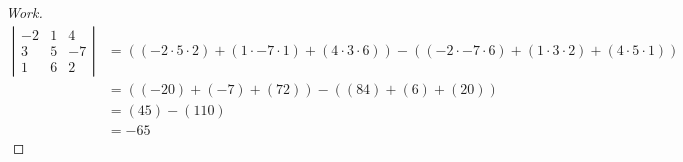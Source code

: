 \documentclass{article}
\begin{document}
\begin{proof}[Work]
  \begin{align*}
    \left\lvert\begin{array}{ccc}
                 -2 & 1 & 4  \\
                 3  & 5 & -7 \\
                 1  & 6 & 2
               \end{array} \right\rvert & = ((-2 \cdot 5 \cdot 2)+(1 \cdot -7 \cdot 1)+(4 \cdot 3 \cdot 6))-((-2 \cdot -7 \cdot 6)+(1 \cdot 3 \cdot 2)+(4 \cdot 5 \cdot 1)) \\
                                  & = ((-20)+(-7)+(72))-((84)+(6)+(20))                                                                                                     \\
                                  & = (45)-(110)                                                                                                                            \\
                                  & = -65
  \end{align*}
\end{proof}
\qdash
\end{document}
